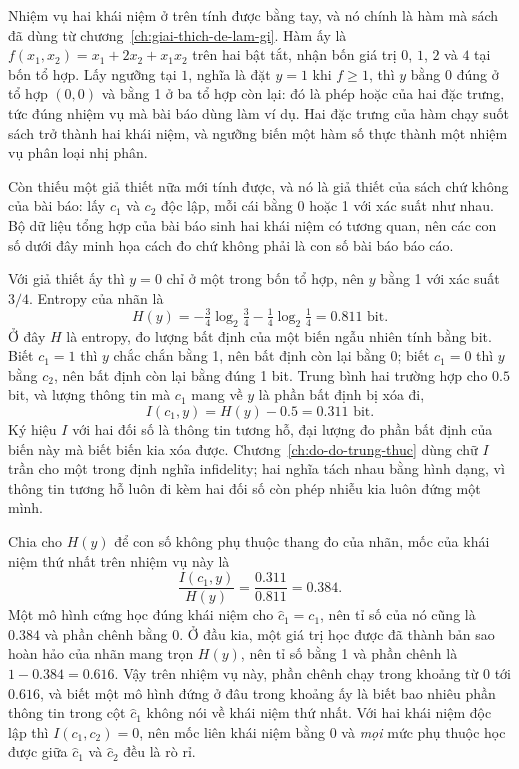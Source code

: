 %
Nhiệm vụ hai khái niệm ở trên tính được bằng tay, và nó chính là hàm mà sách đã
dùng từ chương~\ref{ch:giai-thich-de-lam-gi}. Hàm ấy là
$f(x_1,x_2) = x_1 + 2x_2 + x_1x_2$ trên hai  bật tắt,
nhận bốn giá trị
$0$, $1$, $2$ và $4$ tại bốn tổ hợp. Lấy ngưỡng tại $1$, nghĩa là đặt $y = 1$
khi $f \ge 1$, thì $y$ bằng 0 đúng ở tổ hợp $(0,0)$ và bằng 1 ở ba tổ hợp còn
lại: đó là phép hoặc của hai đặc trưng, tức đúng nhiệm vụ mà bài báo dùng làm ví
dụ. Hai đặc trưng của hàm chạy suốt sách trở thành hai khái niệm, và ngưỡng biến
một hàm số thực thành một nhiệm vụ phân loại nhị phân.

Còn thiếu một giả thiết nữa mới tính được, và nó là giả thiết của sách chứ không
của bài báo: lấy $c_1$ và $c_2$ độc lập, mỗi cái bằng 0 hoặc 1 với xác suất như
nhau. Bộ dữ liệu tổng hợp của bài báo sinh hai khái niệm có tương quan, nên các
con số dưới đây minh họa cách đo chứ không phải là con số bài báo báo cáo.

Với giả thiết ấy thì $y = 0$ chỉ ở một trong bốn tổ hợp, nên $y$ bằng 1 với xác
suất $3/4$. Entropy của nhãn là
\[
  H(y) = -\tfrac{3}{4}\log_2\tfrac{3}{4} - \tfrac{1}{4}\log_2\tfrac{1}{4}
       = 0.811 \text{ bit} .
\]
Ở đây $H$ là entropy, đo lượng bất định của một biến ngẫu nhiên tính bằng bit.
Biết $c_1 = 1$ thì $y$ chắc chắn bằng 1, nên bất định còn lại bằng 0; biết
$c_1 = 0$ thì $y$ bằng $c_2$, nên bất định còn lại bằng đúng 1 bit. Trung bình
hai trường hợp cho $0.5$ bit, và lượng thông tin mà $c_1$ mang về $y$ là phần
bất định bị xóa đi,
\[
  I(c_1, y) = H(y) - 0.5 = 0.311 \text{ bit} .
\]
Ký hiệu $I$ với hai đối số là thông tin tương hỗ, đại lượng đo phần bất định của
biến này mà biết biến kia xóa được. Chương~\ref{ch:do-do-trung-thuc} dùng chữ
$I$ trần cho một  trong định nghĩa infidelity; hai
nghĩa tách nhau bằng hình dạng, vì thông tin tương hỗ luôn đi kèm hai đối số còn
phép nhiễu kia luôn đứng một mình.

Chia cho $H(y)$ để con số không phụ thuộc thang đo của nhãn, mốc của khái niệm
thứ nhất trên nhiệm vụ này là
\[
  \frac{I(c_1, y)}{H(y)} = \frac{0.311}{0.811} = 0.384 .
\]
Một mô hình cứng học đúng khái niệm cho $\hat c_1 = c_1$, nên tỉ số của nó cũng
là $0.384$ và phần chênh bằng 0. Ở đầu kia, một giá trị học được đã thành bản
sao hoàn hảo của nhãn mang trọn $H(y)$, nên tỉ số bằng 1 và phần chênh là
$1 - 0.384 = 0.616$. Vậy trên nhiệm vụ này, phần chênh chạy trong khoảng từ 0
tới $0.616$, và biết một mô hình đứng ở đâu trong khoảng ấy là biết bao nhiêu
phần thông tin trong cột $\hat c_1$ không nói về khái niệm thứ nhất. Với hai
khái niệm độc lập thì $I(c_1,c_2) = 0$, nên mốc liên khái niệm bằng 0 và
\emph{mọi} mức phụ thuộc học được giữa $\hat c_1$ và $\hat c_2$ đều là rò rỉ.

